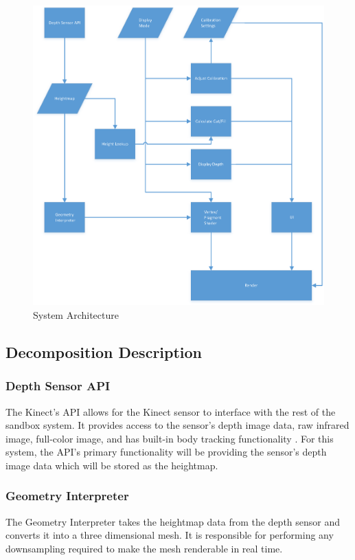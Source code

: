\documentclass[onecolumn, draftclsnofoot,10pt, compsoc]{IEEEtran}
\begin{document}
\begin{figure}[H]
	\centering
	\includegraphics[width=6in]{SysArch}
    \caption{System Architecture}
    \label{fig:sysarchitecture}
\end{figure}



\subsection{Decomposition Description}
\subsubsection{Depth Sensor API} %

The Kinect's API allows for the Kinect sensor to interface with the rest of the sandbox system.
It provides access to the sensor's depth image data, raw infrared image, full-color image, and has built-in body tracking functionality \cite{kinect_api_overview}.
For this system, the API's primary functionality will be providing the sensor's depth image data which will be stored as the heightmap.


\subsubsection{Geometry Interpreter} %
The Geometry Interpreter takes the heightmap data from the depth sensor and converts it into a three dimensional mesh.
It is responsible for performing any downsampling required to make the mesh renderable in real time.
\end{document}
